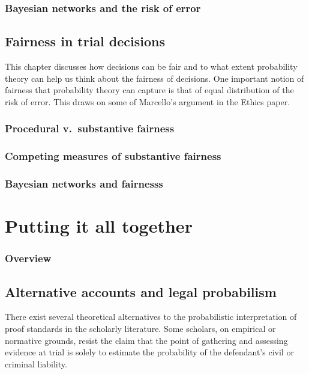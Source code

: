 \documentclass[]{book}
\begin{document}
\section{Bayesian networks and 
the risk of error}

\chapter{Fairness in trial decisions}

This chapter discusses how decisions can be fair and to what extent probability
theory can help us think about the fairness of decisions.
One important notion of fairness that probability theory
can capture is that of equal distribution of the risk of error.
This draws on some of Marcello's argument in the Ethics paper.


\section{Procedural v.\ substantive fairness}

\section{Competing measures of substantive fairness}

\section{Bayesian networks and fairnesss}

\part{Putting it all together}

\section*{Overview}

\chapter{Alternative accounts and legal probabilism}

There exist several theoretical alternatives to the probabilistic interpretation of proof standards in the scholarly literature. Some scholars, on empirical or normative grounds, resist the claim that the point of gathering and assessing evidence at trial is solely to estimate the probability of the defendant's civil or criminal liability.
\end{document}
